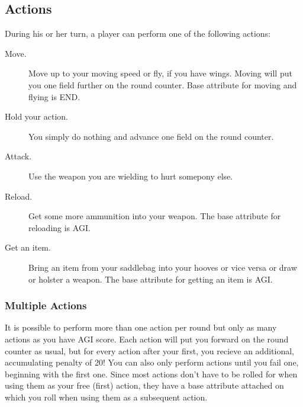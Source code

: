 \subsection{Actions}
During his or her turn, a player can perform one of the following actions:
\begin{description}
\item[Move.] Move up to your moving speed or fly, if you have wings. Moving will put you one field further on the round counter. Base attribute for moving and flying is END.
\item[Hold your action.] You simply do nothing and advance one field on the round counter.
\item[Attack.] Use the weapon you are wielding to hurt somepony else.
\item[Reload.] Get some more ammunition into your weapon. The base attribute for reloading is AGI.
\item[Get an item.] Bring an item from your saddlebag into your hooves or vice versa or draw or holster a weapon. The base attribute for getting an item is AGI.
\end{description}
\subsubsection{Multiple Actions}
It is possible to perform more than one action per round but only as many actions as you have AGI score. Each action will put you forward on the round counter as usual, but for every action after your first, you recieve an additional, accumulating penalty of 20! You can also only perform actions until you fail one, beginning with the first one. Since most actions don't have to be rolled for when using them as your free (first) action, they have a base attribute attached on which you roll when using them as a subsequent action.